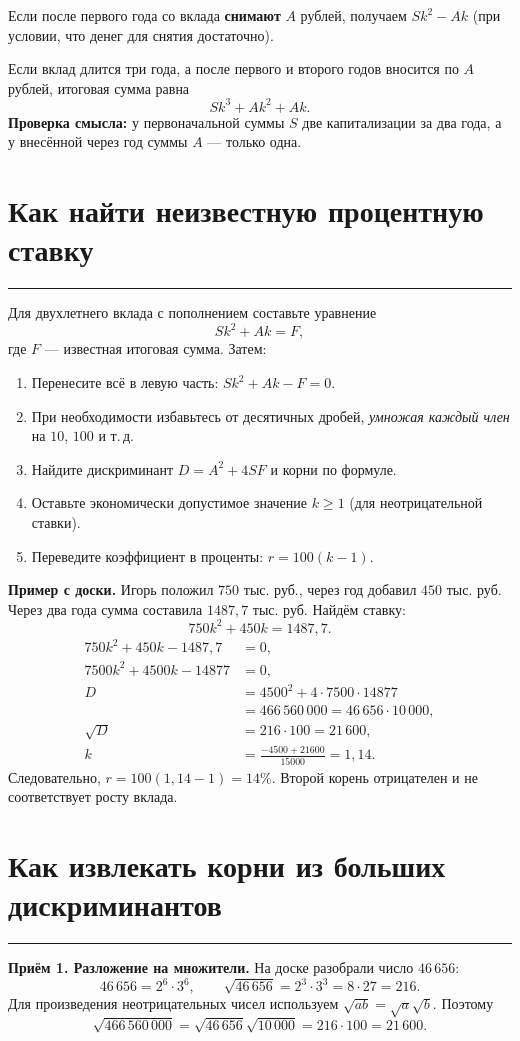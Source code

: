 \documentclass[a4paper,11pt]{article}
\newcommand{\key}[1]{\textcolor{darkaccent}{\textbf{#1}}}
\newcommand{\sepheading}[1]{\section{#1}\vspace{-4pt}\noindent\textcolor{accent}{\rule{\linewidth}{0.45pt}}\vspace{1pt}}
\begin{document}
Если после первого года со вклада \textbf{снимают} $A$ рублей, получаем $Sk^2-Ak$ (при условии, что денег для снятия достаточно).

Если вклад длится три года, а после первого и второго годов вносится по $A$ рублей, итоговая сумма равна
\[
Sk^3+Ak^2+Ak.
\]
\key{Проверка смысла:} у первоначальной суммы $S$ две капитализации за два года, а у внесённой через год суммы $A$ --- только одна.

\sepheading{Как найти неизвестную процентную ставку}
Для двухлетнего вклада с пополнением составьте уравнение
\[
Sk^2+Ak=F,
\]
где $F$ --- известная итоговая сумма. Затем:
\begin{enumerate}
\item Перенесите всё в левую часть: $Sk^2+Ak-F=0$.
\item При необходимости избавьтесь от десятичных дробей, \emph{умножая каждый член} на $10$, $100$ и т.\,д.
\item Найдите дискриминант $D=A^2+4SF$ и корни по формуле.
\item Оставьте экономически допустимое значение $k\ge1$ (для неотрицательной ставки).
\item Переведите коэффициент в проценты: $r=100(k-1)$.
\end{enumerate}

\textcolor{darkaccent}{\textbf{Пример с доски.}} Игорь положил $750$ тыс. руб., через год добавил $450$ тыс. руб. Через два года сумма составила $1487{,}7$ тыс. руб. Найдём ставку:
\[
750k^2+450k=1487{,}7.
\]
\[
\begin{aligned}
750k^2+450k-1487{,}7&=0,\\
7500k^2+4500k-14877&=0,\\
D&=4500^2+4\cdot7500\cdot14877\\
 &=466\,560\,000=46\,656\cdot10\,000,\\
\sqrt D&=216\cdot100=21\,600,\\
k&=\frac{-4500+21600}{15000}=1{,}14.
\end{aligned}
\]
Следовательно, $r=100(1{,}14-1)=\boxed{14\%}$. Второй корень отрицателен и не соответствует росту вклада.

\sepheading{Как извлекать корни из больших дискриминантов}
\textbf{Приём 1. Разложение на множители.} На доске разобрали число $46\,656$:
\[
46\,656=2^6\cdot3^6,\qquad
\sqrt{46\,656}=2^3\cdot3^3=8\cdot27=216.
\]
Для произведения неотрицательных чисел используем $\sqrt{ab}=\sqrt a\sqrt b$. Поэтому
\[
\sqrt{466\,560\,000}=\sqrt{46\,656}\sqrt{10\,000}=216\cdot100=21\,600.
\]
\end{document}
